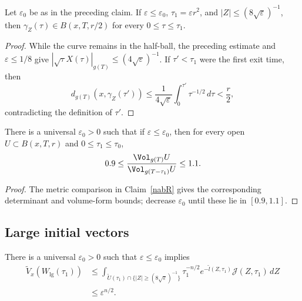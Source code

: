 \begin{claim}
\label{claim:l-geodesic-stays-in-ball}
\label{inside}
Let $\varepsilon_0$ be as in the preceding claim. If
$\varepsilon\leq\varepsilon_0$, $\tau_1=\varepsilon r^2$, and
$|Z|\leq(8\sqrt\varepsilon)^{-1}$, then
$\gamma_Z(\tau)\in B(x,T,r/2)$ for every $0\leq\tau\leq\tau_1$.
\end{claim}

\begin{proof}
\sketch
{}
While the curve remains in the half-ball, the preceding estimate and
$\varepsilon\leq1/8$ give
$|\sqrt\tau X(\tau)|_{g(T)}\leq(4\sqrt\varepsilon)^{-1}$. If $\tau'<\tau_1$
were the first exit time, then
\[
  d_{g(T)}(x,\gamma_Z(\tau'))
  \leq\frac1{4\sqrt\varepsilon}
  \int_0^{\tau'}\tau^{-1/2}\,d\tau
  <\frac r2,
\]
contradicting the definition of $\tau'$.
\end{proof}

\begin{claim}
\label{claim:volume-comparison-time-slices}
\label{volvomp}
There is a universal $\varepsilon_0>0$ such that if
$\varepsilon\leq\varepsilon_0$, then for every open
$U\subset B(x,T,r)$ and $0\leq\tau_1\leq\tau_0$,
\[
  0.9\leq
  \frac{\Vol_{g(T)}U}{\Vol_{g(T-\tau_1)}U}
  \leq1.1.
\]
\end{claim}

\begin{proof}
\sketch
{}
The metric comparison in Claim~\ref{nabR} gives the corresponding determinant
and volume-form bounds; decrease $\varepsilon_0$ until these lie in
$[0.9,1.1]$.
\end{proof}

\subsection{Large initial vectors}

\begin{lemma}
\label{lem:reduced-volume-large-directions}
\label{large}
There is a universal $\varepsilon_0>0$ such that
$\varepsilon\leq\varepsilon_0$ implies
\[
\begin{split}
  \widetilde V_x(W_{\mathrm{lg}}(\tau_1))
  &\leq
  \int_{\widetilde U(\tau_1)\cap
  \{|Z|\geq(8\sqrt\varepsilon)^{-1}\}}
  \tau_1^{-n/2}e^{-\widetilde l(Z,\tau_1)}
  {\mathcal J}(Z,\tau_1)\,dZ\\
  &\leq\varepsilon^{n/2}.
\end{split}
\]
\end{lemma}

